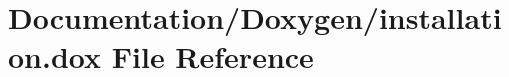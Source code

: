 \hypertarget{installation_8dox}{}\section{Documentation/\+Doxygen/installation.dox File Reference}
\label{installation_8dox}
